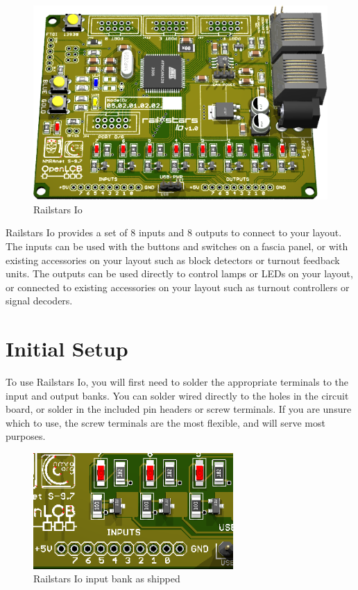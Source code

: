 \documentclass[12pt]{book}
\begin{document}
\begin{figure}[htbp]
\begin{center}
\includegraphics[width=6in]{images/RailstarsIo.png}
\caption{Railstars Io}
\label{Io}
\end{center}
\end{figure}


Railstars Io provides a set of 8 inputs and 8 outputs to connect to your layout. The inputs can be used with the buttons and switches on a fascia panel, or with existing accessories on your layout such as block detectors or turnout feedback units. The outputs can be used directly to control lamps or LEDs on your layout, or connected to existing accessories on your layout such as turnout controllers or signal decoders.

\section{Initial Setup}

To use Railstars Io, you will first need to solder the appropriate terminals to the input and output banks. You can solder wired directly to the holes in the circuit board, or solder in the included pin headers or screw terminals. If you are unsure which to use, the screw terminals are the most flexible, and will serve most purposes.

\begin{figure}[htbp]
\begin{center}
\includegraphics[width=3in]{images/IoInputEmpty.png}
\caption{Railstars Io input bank as shipped}
\label{bareinput}
\end{center}
\end{figure}
\end{document}
